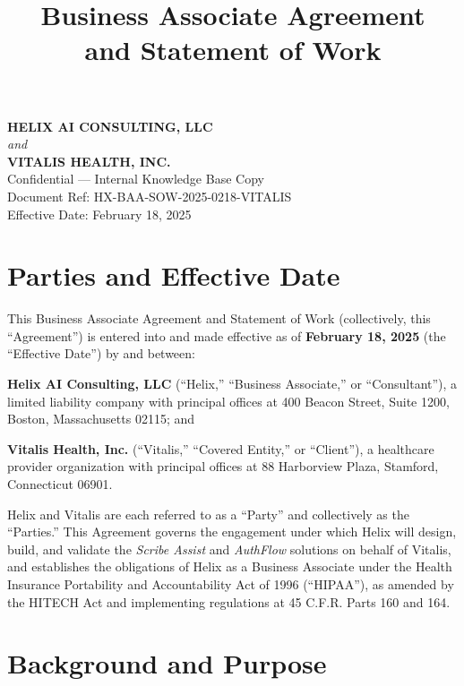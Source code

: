 \documentclass[11pt]{article}
\title{\vspace{-2.5em}\textbf{Business Associate Agreement \\ and Statement of Work}}
\author{}
\date{}
\begin{document}
\maketitle
\vspace{-3em}

\begin{center}
\textbf{HELIX AI CONSULTING, LLC} \\
\textit{and} \\
\textbf{VITALIS HEALTH, INC.} \\[0.5em]
\small Confidential --- Internal Knowledge Base Copy \\
Document Ref: HX-BAA-SOW-2025-0218-VITALIS \\
Effective Date: February 18, 2025
\end{center}

\vspace{1em}

\section{Parties and Effective Date}

This Business Associate Agreement and Statement of Work (collectively, this ``Agreement'') is entered into and made effective as of \textbf{February 18, 2025} (the ``Effective Date'') by and between:

\textbf{Helix AI Consulting, LLC} (``Helix,'' ``Business Associate,'' or ``Consultant''), a limited liability company with principal offices at 400 Beacon Street, Suite 1200, Boston, Massachusetts 02115; and

\textbf{Vitalis Health, Inc.} (``Vitalis,'' ``Covered Entity,'' or ``Client''), a healthcare provider organization with principal offices at 88 Harborview Plaza, Stamford, Connecticut 06901.

Helix and Vitalis are each referred to as a ``Party'' and collectively as the ``Parties.'' This Agreement governs the engagement under which Helix will design, build, and validate the \textit{Scribe Assist} and \textit{AuthFlow} solutions on behalf of Vitalis, and establishes the obligations of Helix as a Business Associate under the Health Insurance Portability and Accountability Act of 1996 (``HIPAA''), as amended by the HITECH Act and implementing regulations at 45 C.F.R. Parts 160 and 164.

\section{Background and Purpose}
\end{document}
